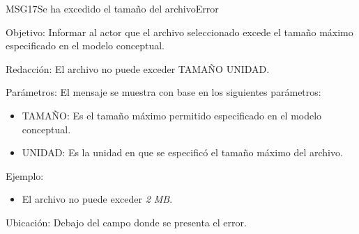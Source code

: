 \begin{mensaje}{MSG17}{Se ha excedido el tamaño del archivo}{Error}
	\item [Objetivo:] Informar al actor que el archivo seleccionado excede el tamaño máximo especificado en el modelo conceptual.
	\item[Redacción:] El archivo no puede exceder TAMAÑO UNIDAD.
	\item[Parámetros:] El mensaje se muestra con base en los siguientes parámetros:
	\begin{itemize}
		\item TAMAÑO: Es el tamaño máximo permitido especificado en el modelo conceptual.
		\item UNIDAD: Es la unidad en que se especificó el tamaño máximo del archivo.
	\end{itemize}
	\item[Ejemplo:] \begin{itemize}
		\item El archivo no puede exceder {\em 2 MB}.
	\end{itemize}
	\item [Ubicación:] Debajo del campo donde se presenta el error.
\end{mensaje}